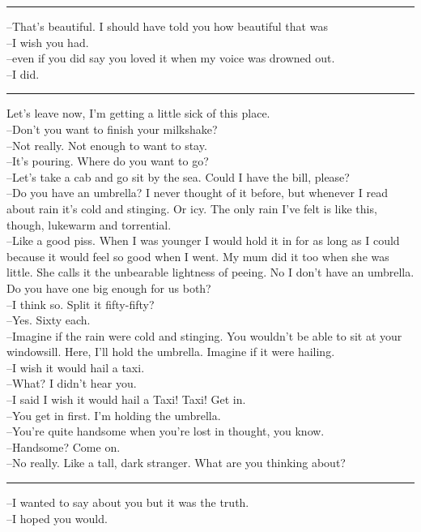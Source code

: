 \documentclass[12pt]{memoir}
\begin{document}
\hrule 
\vspace{\baselineskip}
--That's beautiful. I should have told you how beautiful that was\\
--I wish you had.\\
--even if you did say you loved it when my voice was drowned out.\\
--I did. \\
\hrule 
\vspace{\baselineskip}
Let's leave now, I'm getting a little sick of this place.\\
--Don't you want to finish your milkshake?\\
--Not really. Not enough to want to stay.\\
--It's pouring. Where do you want to go?\\
--Let's take a cab and go sit by the sea. Could I have the bill, please?\\
--Do you have an umbrella? I never thought of it before, but whenever I read about rain it's cold and stinging. Or icy. The only rain I've felt is like this, though, lukewarm and torrential.\\
--Like a good piss. When I was younger I would hold it in for as long as I could because it would feel so good when I went. My mum did it too when she was little. She calls it the unbearable lightness of peeing. No I don't have an umbrella. Do you have one big enough for us both?\\
--I think so. Split it fifty-fifty?\\
--Yes. Sixty each.\\
--Imagine if the rain were cold and stinging. You wouldn't be able to sit at your windowsill. Here, I'll hold the umbrella. Imagine if it were hailing.\\
--I wish it would hail a taxi.\\
--What? I didn't hear you.\\
--I said I wish it would hail a Taxi! Taxi! Get in.\\
--You get in first. I'm holding the umbrella.\\
--You're quite handsome when you're lost in thought, you know.\\
--Handsome? Come on.\\
--No really. Like a tall, dark stranger. What are you thinking about?\\
\hrule 
\vspace{\baselineskip}
--I wanted to say about you but it was the truth.\\
--I hoped you would.\\
\end{document}
